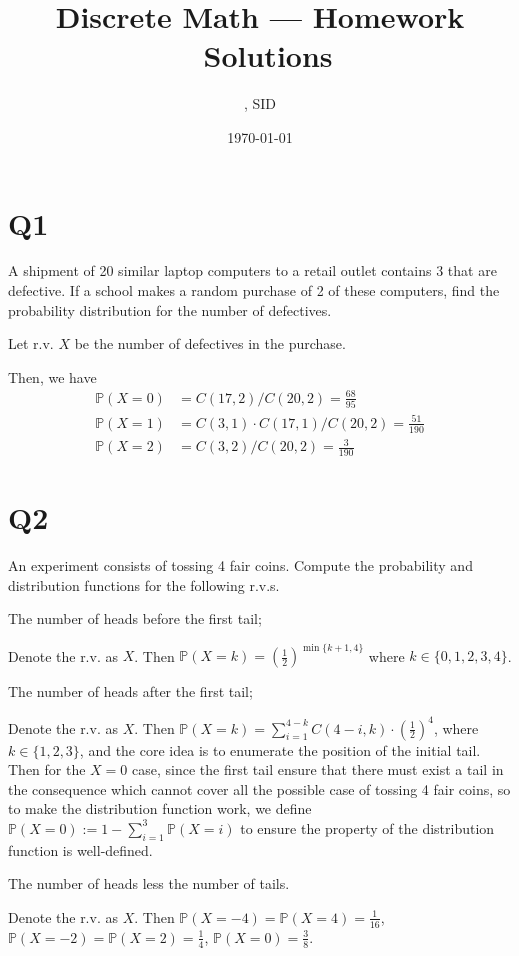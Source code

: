 \documentclass[11pt]{article}
\title{Discrete Math --- Homework \Homework \ Solutions}
\author{\Name, SID \SID}
\date{\today}
\begin{document}
\maketitle

\section*{Q1}
A shipment of 20 similar laptop computers to a retail outlet
contains 3 that are defective. If a school makes a random
purchase of 2 of these computers, ﬁnd the probability
distribution for the number of defectives.
\begin{solution}
    Let r.v. $X$ be the number of defectives
    in the purchase.

    Then, we have
    \begin{align*}
        \mathbb{P}(X=0)&=C(17 , 2) / C(20 , 2)=\frac{68}{95} \\
        \mathbb{P}(X=1)&=C(3 , 1)\cdot C(17 , 1) / C(20 , 2)=\frac{51}{190}\\
        \mathbb{P}(X=2)&=C(3,2) / C(20 , 2) =\frac{3}{190} 
    \end{align*}

\end{solution}

\section*{Q2}
An experiment consists of tossing 4 fair coins. Compute the
probability and distribution functions for the following r.v.s.
\begin{qparts}
    
    \item The number of heads before the first tail;
    \begin{solution}
        Denote the r.v. as $X$. Then $\mathbb{P}(X=k)=(\frac{1}{2})^{\min \{ k+1,4 \}}$ where 
        $k \in \{ 0,1,2,3,4 \}$.
    \end{solution}

    \item The number of heads after the first tail;
    \begin{solution}
        Denote the r.v. as $X$. 
        Then $\mathbb{P}(X=k)=\sum_{i=1}^{4-k}C(4-i,k)\cdot (\frac{1}{2})^{4}$, where 
        $k \in \{ 1,2,3 \}$, and the core idea is to enumerate the position of the initial tail. Then for the $X=0$ case, since the first tail ensure that there must exist a tail in the consequence which cannot cover all the possible case of tossing 4 fair coins, so to make the distribution function work, we define $\mathbb{P}(X=0):=1-\sum_{i=1}^{3}\mathbb{P}(X=i)$ to ensure the property of the distribution function is well-defined.
    \end{solution}

    \item The number of heads less the number of tails.
    \begin{solution}
        Denote the r.v. as $X$. Then $\mathbb{P}(X=-4)=\mathbb{P}(X=4)=\frac{1}{16}$,
        $\mathbb{P}(X=-2)=\mathbb{P}(X=2)=\frac{1}{4}$, $\mathbb{P}(X=0)=\frac{3}{8}$.
    \end{solution}
\end{qparts}
\end{document}
